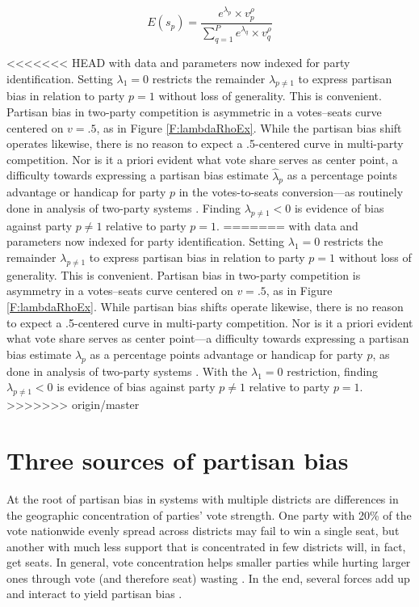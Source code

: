 \documentclass[letter,12pt]{article}
\begin{document}
\begin{equation}\label{E:kingMulti}
 E(s_p) = \frac{e^{\lambda_p} \times v_p^\rho}{\sum_{q=1}^{P} e^{\lambda_q} \times v_q^\rho}
\end{equation}

<<<<<<< HEAD
\noindent with data and parameters now indexed for party identification. Setting $\lambda_1 = 0$ restricts the remainder $\lambda_{p \neq 1}$ to express partisan bias in relation to party $p=1$ without loss of generality. This is convenient. Partisan bias in two-party competition is asymmetric in a votes--seats curve centered on $v=.5$, as in Figure \ref{F:lambdaRhoEx}. While the partisan bias shift operates likewise, there is no reason to expect a .5-centered curve in multi-party competition. Nor is it a priori evident what vote share serves as center point, a difficulty towards expressing a partisan bias estimate $\hat{\lambda}_p$ as a percentage points advantage or handicap for party $p$ in the votes-to-seats conversion---as routinely done in analysis of two-party systems \citep[e.g.,][]{cox.katz.2002}. Finding $\lambda_{p \neq 1}<0$ is evidence of bias against party $p \neq 1$ relative to party $p=1$.
=======
\noindent with data and parameters now indexed for party identification. Setting $\lambda_1 = 0$ restricts the remainder $\lambda_{p \neq 1}$ to express partisan bias in relation to party $p=1$ without loss of generality. This is convenient. Partisan bias in two-party competition is asymmetry in a votes--seats curve centered on $v=.5$, as in Figure \ref{F:lambdaRhoEx}. While partisan bias shifts operate likewise, there is no reason to expect a .5-centered curve in multi-party competition. Nor is it a priori evident what vote share serves as center point---a difficulty towards expressing a partisan bias estimate $\hat{\lambda}_p$ as a percentage points advantage or handicap for party $p$, as done in analysis of two-party systems \citep[e.g.,][]{cox.katz.2002}. With the $\lambda_1 = 0$ restriction, finding $\lambda_{p \neq 1}<0$ is evidence of bias against party $p \neq 1$ relative to party $p=1$.
>>>>>>> origin/master

\section{Three sources of partisan bias}

At the root of partisan bias in systems with multiple districts are differences in the geographic concentration of parties' vote strength. One party with 20\% of the vote nationwide evenly spread across districts may fail to win a single seat, but another with much less support that is concentrated in few districts will, in fact, get seats. In general, vote concentration helps smaller parties while hurting larger ones through vote (and therefore seat) wasting \citep{calvo.roddenMultipartyPlurality2015}. In the end, several forces add up and interact to yield partisan bias \citep{gudgin.taylor.1980decomposeBias}. 
\end{document}
